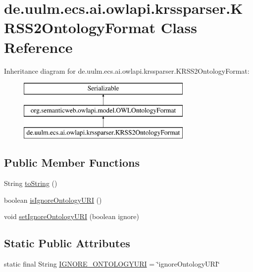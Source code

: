 \hypertarget{classde_1_1uulm_1_1ecs_1_1ai_1_1owlapi_1_1krssparser_1_1_k_r_s_s2_ontology_format}{\section{de.\-uulm.\-ecs.\-ai.\-owlapi.\-krssparser.\-K\-R\-S\-S2\-Ontology\-Format Class Reference}
\label{classde_1_1uulm_1_1ecs_1_1ai_1_1owlapi_1_1krssparser_1_1_k_r_s_s2_ontology_format}
}
Inheritance diagram for de.\-uulm.\-ecs.\-ai.\-owlapi.\-krssparser.\-K\-R\-S\-S2\-Ontology\-Format\-:\begin{figure}[H]
\begin{center}
\leavevmode
\includegraphics[height=3.000000cm]{classde_1_1uulm_1_1ecs_1_1ai_1_1owlapi_1_1krssparser_1_1_k_r_s_s2_ontology_format}
\end{center}
\end{figure}
\subsection*{Public Member Functions}
\begin{DoxyCompactItemize}
\item 
String \hyperlink{classde_1_1uulm_1_1ecs_1_1ai_1_1owlapi_1_1krssparser_1_1_k_r_s_s2_ontology_format_ad105246ee5729135143713b37af6c88d}{to\-String} ()
\item 
boolean \hyperlink{classde_1_1uulm_1_1ecs_1_1ai_1_1owlapi_1_1krssparser_1_1_k_r_s_s2_ontology_format_a58d49b838d90a464996864877d607496}{is\-Ignore\-Ontology\-U\-R\-I} ()
\item 
void \hyperlink{classde_1_1uulm_1_1ecs_1_1ai_1_1owlapi_1_1krssparser_1_1_k_r_s_s2_ontology_format_a6a147f11bc36737faca474ea1d9d0c2b}{set\-Ignore\-Ontology\-U\-R\-I} (boolean ignore)
\end{DoxyCompactItemize}
\subsection*{Static Public Attributes}
\begin{DoxyCompactItemize}
\item 
static final String \hyperlink{classde_1_1uulm_1_1ecs_1_1ai_1_1owlapi_1_1krssparser_1_1_k_r_s_s2_ontology_format_a86e38eb1f55e10756ffda14d31e807b1}{I\-G\-N\-O\-R\-E\-\_\-\-O\-N\-T\-O\-L\-O\-G\-Y\-U\-R\-I} = \char`\"{}ignore\-Ontology\-U\-R\-I\char`\"{}
\end{DoxyCompactItemize}
